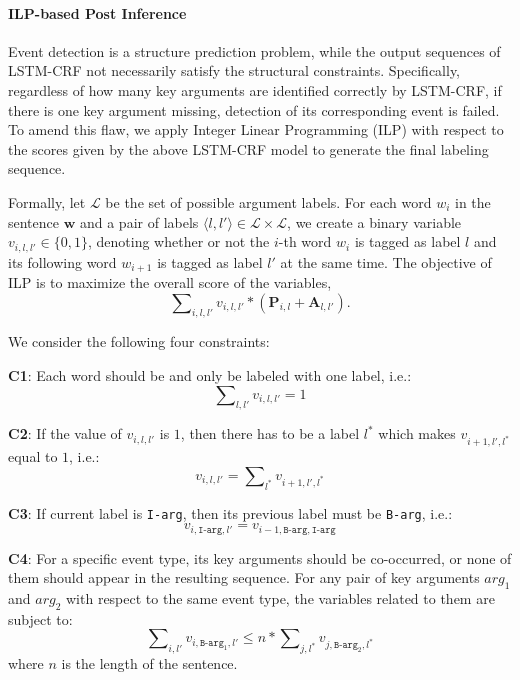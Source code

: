 \documentclass{article}
\begin{document}
\paragraph{ILP-based Post Inference}
Event detection is a structure prediction problem, while the output sequences of LSTM-CRF not necessarily satisfy the structural constraints. Specifically, regardless of how many key arguments are identified correctly by LSTM-CRF, if there is one key argument missing, detection of its corresponding event is failed. To amend this flaw, we apply Integer Linear Programming (ILP) with respect to the scores given by the above LSTM-CRF model to generate the final labeling sequence.

Formally, let $\mathcal{L}$ be the set of possible argument labels. For each word $w_i$ in the sentence $\bm{w}$ and a pair of labels $ \langle l, l' \rangle \in \mathcal{L} \times \mathcal{L}$, we create a binary variable ${v_{i,l,l'} \in \{0, 1\}}$, denoting whether or not the $i$-th word $w_i$ is tagged as label $l$ and its following word $w_{i+1}$ is tagged as label $l'$ at the same time. The objective of ILP is to maximize the overall score of the variables,
\begin{displaymath}
	\sum\nolimits_{i, l, l'}v_{i,l,l'} * (\textbf{P}_{i,l}+\textbf{A}_{l,l'}) .
\end{displaymath}

We consider the following four constraints:

\textbf{C1}: Each word should be and only be labeled with one label, i.e.:
\begin{equation}
	\sum\nolimits_{l,l'}v_{i,l,l'}=1
\end{equation}

\textbf{C2}: If the value of $v_{i,l,l'}$ is $1$, then there has to be a label $l^*$ which makes $v_{i+1,l',l^*}$ equal to $1$, i.e.:
\begin{equation}
	v_{i,l,l'} = \sum\nolimits_{l^*}v_{i+1,l',l^*}
\end{equation}

\textbf{C3}: If current label is \texttt{I-arg}, then its previous label must be \texttt{B-arg}, i.e.:
\begin{equation}
	v_{i,\texttt{I-arg},l'} = v_{i-1,\texttt{B-arg},\texttt{I-arg}}
\end{equation}

\textbf{C4}: For a specific event type, its key arguments should be co-occurred, or none of them should appear in the resulting sequence. For any pair of key arguments $arg_1$ and $arg_2$ with respect to the same event type, the variables related to them are subject to:
\begin{equation}
	\sum\nolimits_{i,l'}{v_{i,\texttt{B-arg}_1,l'}} \leq n * \sum\nolimits_{j,l^*}{v_{j,\texttt{B-arg}_2,l^*}}
\end{equation}
where $n$ is the length of the sentence.
\end{document}
